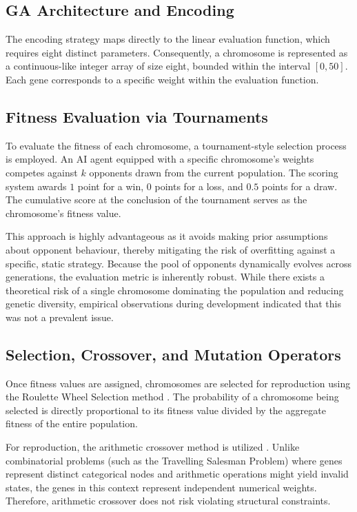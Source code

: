 \subsection{GA Architecture and Encoding}
The encoding strategy maps directly to the linear evaluation function, which requires eight distinct parameters. Consequently, a chromosome is represented as a continuous-like integer array of size eight, bounded within the interval $[0, 50]$. Each gene corresponds to a specific weight within the evaluation function.

\subsection{Fitness Evaluation via Tournaments}
To evaluate the fitness of each chromosome, a tournament-style selection process is employed. An AI agent equipped with a specific chromosome's weights competes against $k$ opponents drawn from the current population. The scoring system awards $1$ point for a win, $0$ points for a loss, and $0.5$ points for a draw. The cumulative score at the conclusion of the tournament serves as the chromosome's fitness value.

This approach is highly advantageous as it avoids making prior assumptions about opponent behaviour, thereby mitigating the risk of overfitting against a specific, static strategy. Because the pool of opponents dynamically evolves across generations, the evaluation metric is inherently robust. While there exists a theoretical risk of a single chromosome dominating the population and reducing genetic diversity, empirical observations during development indicated that this was not a prevalent issue.

\subsection{Selection, Crossover, and Mutation Operators}
Once fitness values are assigned, chromosomes are selected for reproduction using the Roulette Wheel Selection method \cite{Katoch2021}. The probability of a chromosome being selected is directly proportional to its fitness value divided by the aggregate fitness of the entire population.

For reproduction, the arithmetic crossover method is utilized \cite{Katoch2021}. Unlike combinatorial problems (such as the Travelling Salesman Problem) where genes represent distinct categorical nodes and arithmetic operations might yield invalid states, the genes in this context represent independent numerical weights. Therefore, arithmetic crossover does not risk violating structural constraints.

